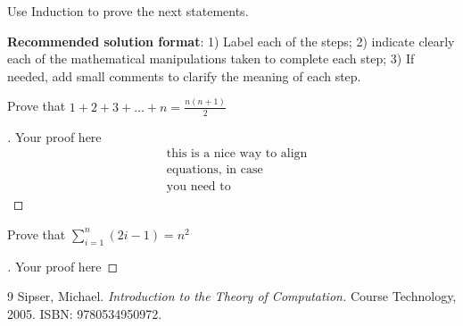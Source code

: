 \documentclass[12pt]{article}
\newenvironment{exercise}[2][Exercise]{\begin{trivlist}
\item[\hskip \labelsep {\bfseries #1}\hskip \labelsep {\bfseries #2.}]}{\end{trivlist}}
\newenvironment{solution}[1][{\color{red} Solution:}]{\begin{trivlist}
\item[\hskip \labelsep {\bfseries #1}\hskip \labelsep {\bfseries}]}{\end{trivlist}}
\begin{document}
\begin{exercise}{4} Use Induction to prove the next statements.

    \textbf{Recommended solution format}: 1) Label each of the steps; 2) indicate clearly each of the mathematical manipulations taken to complete each step; 3) If needed, add small comments to clarify the meaning of each step.

\begin{enumerate}[(a)]
    \item Prove that $1 + 2 + 3 + \dots + n = \frac{n(n+1)}{2}$
    \begin{solution} 
        \begin{proof}[\unskip\nopunct]
            Your proof here
            \begin{align*} 
            & \text{this is a nice way to align} \\
            & \text{equations, in case} \\
            & \text{you need to}
            \end{align*}
        \end{proof}
    \end{solution}

\item  Prove that $\sum^{n}_{i=1}(2i - 1) = n^2$


\begin{solution} 
        \begin{proof}[\unskip\nopunct]
            Your proof here
        \end{proof}
    \end{solution}
        
\end{enumerate}        
\end{exercise}

\vfill

\begin{thebibliography}{9}
Sipser, Michael. 
\textit{Introduction to the Theory of Computation.} 
Course Technology, 2005. ISBN: 9780534950972. 

\end{thebibliography}

 
\end{document}
